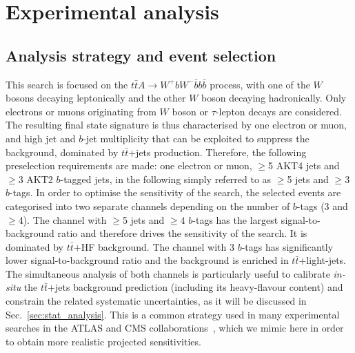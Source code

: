 \documentclass[preprintnumbers,superscriptaddress,nofootinbib,aps,prd,floatfix]{revtex4}
\newcommand{\ttbar}{\ensuremath{t\bar{t}}}
\begin{document}
\section{Experimental analysis}
\label{sec:analysis}

\subsection{Analysis strategy and event selection}
\label{subsec:analysis}
This search is focused on the $\ttbar A \to W^+b W^- \bar{b}b\bar{b}$ process, with one of the $W$ bosons
decaying leptonically and the other $W$ boson decaying hadronically. Only electrons or muons originating 
from $W$ boson or $\tau$-lepton decays are considered. The resulting final state signature is thus characterised
by one electron or muon, and high jet and $b$-jet multiplicity that can be exploited to suppress the background,
dominated by $\ttbar$+jets production. Therefore, the following preselection requirements are made:
one electron or muon, $\geq$5 AKT4 jets and $\geq$3 AKT2 $b$-tagged jets, in the following simply referred
to as $\geq$5 jets and $\geq$3 $b$-tags. In order to optimise the sensitivity of the search, the selected events 
are categorised into two separate channels depending on the number of $b$-tags (3 and $\geq$4).
The channel with $\geq$5 jets and $\geq 4$ $b$-tags has the largest signal-to-background ratio and 
therefore drives the sensitivity of the search. It is dominated by $\ttbar$+HF background. The channel with 3 $b$-tags 
has significantly lower signal-to-background ratio and the background is enriched in $\ttbar$+light-jets.
The simultaneous analysis of both channels is particularly useful to calibrate {\sl in-situ} the $\ttbar$+jets background prediction 
(including its heavy-flavour content) and constrain the related systematic uncertainties, as it will be discussed in
Sec.~\ref{sec:stat_analysis}. This is a common strategy used in many experimental searches in the 
ATLAS and CMS collaborations~\cite{Aad:2015gra,Khachatryan:2015ila,Aad:2015kqa}, 
which we mimic here in order to obtain more realistic projected sensitivities.
\end{document}
